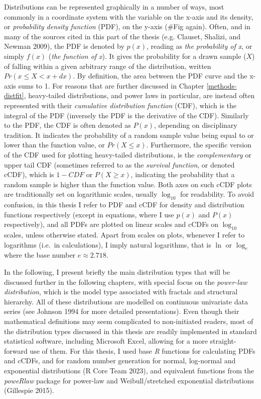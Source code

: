 \documentclass[
  12pt,
]{book}
\begin{document}
Distributions can be represented graphically in a number of ways, most commonly in a coordinate system with the variable on the x-axis and its density, or \emph{probability density function} (PDF), on the y-axis (\#Fig again). Often, and in many of the sources cited in this part of the thesis (e.g. Clauset, Shalizi, and Newman 2009), the PDF is denoted by \(p(x)\), reading as \emph{the probability of x}, or simply \(f(x)\) (\emph{the function of x}). It gives the probability for a drawn sample (\(X\)) of falling within a given arbitrary range of the distribution, written \(Pr(x \le X < x+dx)\). By definition, the area between the PDF curve and the x-axis sums to 1. For reasons that are further discussed in Chapter \ref{methods-distfit}, heavy-tailed distributions, and power laws in particular, are instead often represented with their \emph{cumulative distribution function} (CDF), which is the integral of the PDF (inversely the PDF is the derivative of the CDF). Similarly to the PDF, the CDF is often denoted as \(P(x)\), depending on disciplinary tradition. It indicates the probability of a random sample value being equal to or lower than the function value, or \(Pr(X \le x)\). Furthermore, the specific version of the CDF used for plotting heavy-tailed distributions, is the \emph{complementary} or upper tail CDF (sometimes referred to as the \emph{survival function}, or denoted cCDF), which is \(1-CDF\) or \(P(X \ge x)\), indicating the probability that a random sample is higher than the function value. Both axes on such cCDF plots are traditionally set on logarithmic scales, usually \(\log_{10}\) for readability. To avoid confusion, in this thesis I refer to PDF and cCDF for density and distribution functions respectively (except in equations, where I use \(p(x)\) and \(P(x)\) respectively), and all PDFs are plotted on linear scales and cCDFs on \(\log_{10}\) scales, unless otherwise stated. Apart from scales on plots, whenever I refer to logarithms (i.e.~in calculations), I imply natural logarithms, that is \(\ln\) or \(\log_e\) where the base number \(e \approx 2.718\).

In the following, I present briefly the main distribution types that will be discussed further in the following chapters, with special focus on the \emph{power-law distribution}, which is the model type associated with fractals and structural hierarchy. All of these distributions are modelled on continuous univariate data series (see Johnson 1994 for more detailed presentations). Even though their mathematical definitions may seem complicated to non-initiated readers, most of the distribution types discussed in this thesis are readily implemented in standard statistical software, including Microsoft Excel, allowing for a more straight-forward use of them. For this thesis, I used base \emph{R} functions for calculating PDFs and cCDFs, and for random number generation for normal, log-normal and exponential distributions (R Core Team 2023), and equivalent functions from the \emph{poweRlaw} package for power-law and Weibull/stretched exponential distributions (Gillespie 2015).
\end{document}
